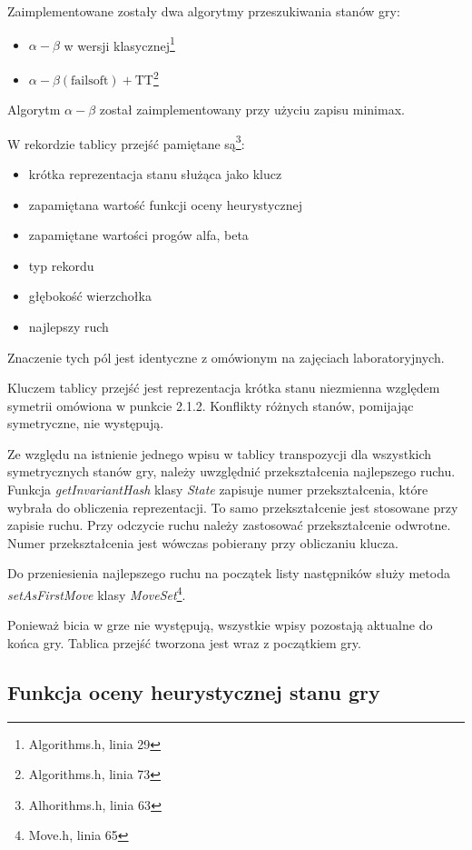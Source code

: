 \documentclass{scrartcl}
\begin{document}
Zaimplementowane zostały dwa algorytmy przeszukiwania stanów gry:
\begin{itemize}
\item $\alpha - \beta$ w wersji klasycznej\footnote{Algorithms.h, 
    linia 29}
\item $\alpha - \beta (\text{failsoft}) + \text{TT}$\footnote{Algorithms.h, linia 73}
\end{itemize}

Algorytm $\alpha - \beta$ został zaimplementowany przy użyciu 
zapisu minimax.

W rekordzie tablicy przejść pamiętane są\footnote{Alhorithms.h, 
linia 63}:
\begin{itemize}
\item{krótka reprezentacja stanu służąca jako klucz}
\item{zapamiętana wartość funkcji oceny heurystycznej}
\item{zapamiętane wartości progów alfa, beta}
\item{typ rekordu}
\item{głębokość wierzchołka}
\item{najlepszy ruch}
\end{itemize}

Znaczenie tych pól jest identyczne z omówionym na zajęciach 
laboratoryjnych. 

Kluczem tablicy przejść jest reprezentacja krótka stanu niezmienna
względem symetrii omówiona w punkcie 2.1.2. Konflikty różnych 
stanów, pomijając symetryczne, nie występują.

Ze względu na istnienie jednego wpisu w tablicy transpozycji dla
wszystkich symetrycznych stanów gry, należy uwzględnić przekształcenia
najlepszego ruchu. Funkcja \emph{getInvariantHash} klasy \emph{State}
zapisuje numer przekształcenia, które wybrała do obliczenia 
reprezentacji. To samo przekształcenie jest stosowane przy zapisie
ruchu. Przy odczycie ruchu należy zastosować przekształcenie
odwrotne. Numer przekształcenia jest wówczas pobierany przy obliczaniu 
klucza.

Do przeniesienia najlepszego ruchu na początek listy następników
służy metoda \emph{setAsFirstMove} klasy \emph{MoveSet}\footnote{
Move.h, linia 65}.

Ponieważ bicia w grze nie występują, wszystkie wpisy pozostają 
aktualne do końca gry. 
Tablica przejść tworzona jest wraz z początkiem gry.


\subsection{Funkcja oceny heurystycznej stanu gry}
\end{document}
